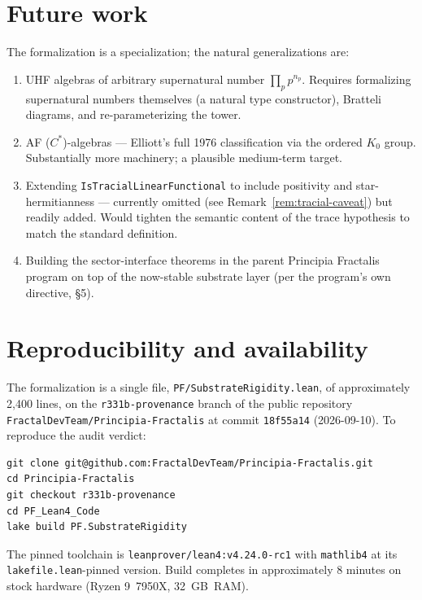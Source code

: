 \documentclass[11pt,a4paper]{article}
\theoremstyle{plain}
\theoremstyle{definition}
\begin{document}
\section{Future work}
\label{sec:future}

The formalization is a specialization; the natural generalizations are:
\begin{enumerate}[leftmargin=*]
  \item UHF algebras of arbitrary supernatural number $\prod_p p^{n_p}$. Requires formalizing supernatural numbers themselves (a natural type constructor), Bratteli diagrams, and re-parameterizing the tower.
  \item AF ($C^{\ast}$)-algebras --- Elliott's full 1976 classification via the ordered $K_0$ group. Substantially more machinery; a plausible medium-term target.
  \item Extending \texttt{IsTracialLinearFunctional} to include positivity and star-hermitianness --- currently omitted (see Remark~\ref{rem:tracial-caveat}) but readily added. Would tighten the semantic content of the trace hypothesis to match the standard definition.
  \item Building the sector-interface theorems in the parent Principia Fractalis program on top of the now-stable substrate layer (per the program's own directive, \S 5).
\end{enumerate}

\section{Reproducibility and availability}
\label{sec:availability}

The formalization is a single file, \texttt{PF/SubstrateRigidity.lean}, of approximately 2{,}400 lines, on the \texttt{r331b-provenance} branch of the public repository \texttt{FractalDevTeam/Principia-Fractalis} at commit \texttt{18f55a14} (2026-09-10). To reproduce the audit verdict:

\begin{lstlisting}[language={}]
git clone git@github.com:FractalDevTeam/Principia-Fractalis.git
cd Principia-Fractalis
git checkout r331b-provenance
cd PF_Lean4_Code
lake build PF.SubstrateRigidity
\end{lstlisting}

\noindent
The pinned toolchain is \texttt{leanprover/lean4:v4.24.0-rc1} with \texttt{mathlib4} at its \texttt{lakefile.lean}-pinned version. Build completes in approximately 8 minutes on stock hardware (Ryzen 9~7950X, 32~GB~RAM).
\end{document}
